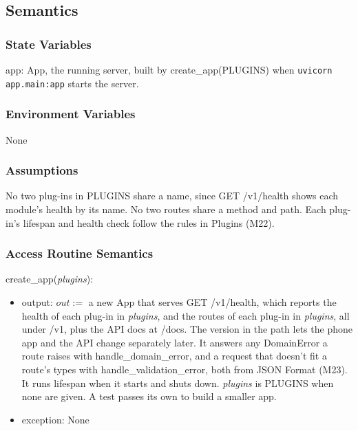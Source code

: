 \documentclass[12pt, titlepage]{article}
\begin{document}
\subsection{Semantics}

\subsubsection{State Variables}

app: App, the running server, built by create\_app(PLUGINS) when
\texttt{uvicorn app.main:app} starts the server.

\subsubsection{Environment Variables}

None

\subsubsection{Assumptions}

No two plug-ins in PLUGINS share a name, since GET /v1/health shows each
module's health by its name. No two routes share a method and path. Each
plug-in's lifespan and health check follow the rules in Plugins (M22).

\subsubsection{Access Routine Semantics}

\noindent create\_app(\textit{plugins}):
\begin{itemize}
\item output: $out :=$ a new App that serves GET /v1/health, which reports
  the health of each plug-in in \textit{plugins}, and the routes of
  each plug-in in \textit{plugins}, all under /v1, plus the API docs at /docs.
  The version in the path lets the phone app and the API change separately
  later. It answers any DomainError a route raises with handle\_domain\_error,
  and a request that doesn't fit a route's types with
  handle\_validation\_error, both from JSON Format (M23). It runs lifespan
  when it starts and shuts down. \textit{plugins} is PLUGINS when none are
  given. A test passes its own to build a smaller app.
\item exception: None
\end{itemize}
\end{document}
